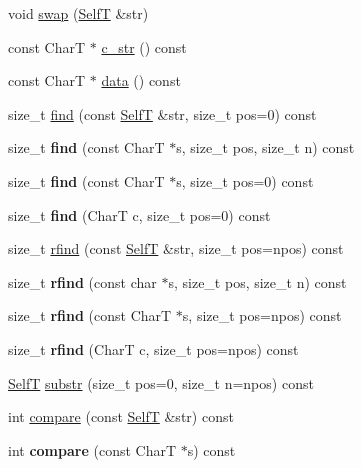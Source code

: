 \begin{CompactItemize}
\item 
void \hyperlink{classbbt__string_04e661fd40f8134bff1b427e08603786}{swap} (\hyperlink{classbbt__string}{SelfT} \&str)
\item 
const CharT $\ast$ \hyperlink{classbbt__string_c153fa7ac5477ba7ef44c684cb396c0b}{c\_\-str} () const 
\item 
const CharT $\ast$ \hyperlink{classbbt__string_bd225f98ab68e2385b6d3e23bd4719cb}{data} () const 
\item 
size\_\-t \hyperlink{classbbt__string_d4e8abb583695fb2be91eaee21827601}{find} (const \hyperlink{classbbt__string}{SelfT} \&str, size\_\-t pos=0) const 
\item 
\hypertarget{classbbt__string_ae10cac797e5601d7300af19f0b90407}{
size\_\-t \textbf{find} (const CharT $\ast$s, size\_\-t pos, size\_\-t n) const }
\label{classbbt__string_ae10cac797e5601d7300af19f0b90407}

\item 
\hypertarget{classbbt__string_845e09e0a102277a233106c0b0920703}{
size\_\-t \textbf{find} (const CharT $\ast$s, size\_\-t pos=0) const }
\label{classbbt__string_845e09e0a102277a233106c0b0920703}

\item 
\hypertarget{classbbt__string_a631cb3200714f67f6f9bb8630b3e4c1}{
size\_\-t \textbf{find} (CharT c, size\_\-t pos=0) const }
\label{classbbt__string_a631cb3200714f67f6f9bb8630b3e4c1}

\item 
size\_\-t \hyperlink{classbbt__string_e9266d980b861118c6996014dadaeafe}{rfind} (const \hyperlink{classbbt__string}{SelfT} \&str, size\_\-t pos=npos) const 
\item 
\hypertarget{classbbt__string_d728504c413696593dd1e32563a81e4e}{
size\_\-t \textbf{rfind} (const char $\ast$s, size\_\-t pos, size\_\-t n) const }
\label{classbbt__string_d728504c413696593dd1e32563a81e4e}

\item 
\hypertarget{classbbt__string_59a26cb95fe7902c9698d48c3178edcd}{
size\_\-t \textbf{rfind} (const CharT $\ast$s, size\_\-t pos=npos) const }
\label{classbbt__string_59a26cb95fe7902c9698d48c3178edcd}

\item 
\hypertarget{classbbt__string_d62f1c73b1c760dca1b981d1a7b02a63}{
size\_\-t \textbf{rfind} (CharT c, size\_\-t pos=npos) const }
\label{classbbt__string_d62f1c73b1c760dca1b981d1a7b02a63}

\item 
\hyperlink{classbbt__string}{SelfT} \hyperlink{classbbt__string_b79ed106ffa94ed529c8697745f8d1f5}{substr} (size\_\-t pos=0, size\_\-t n=npos) const 
\item 
int \hyperlink{classbbt__string_578af910a50c78cee9fe2466706585c1}{compare} (const \hyperlink{classbbt__string}{SelfT} \&str) const 
\item 
\hypertarget{classbbt__string_7462a0602d3d92f1c6890cf103ff9212}{
int \textbf{compare} (const CharT $\ast$s) const }
\label{classbbt__string_7462a0602d3d92f1c6890cf103ff9212}


\end{CompactItemize}
